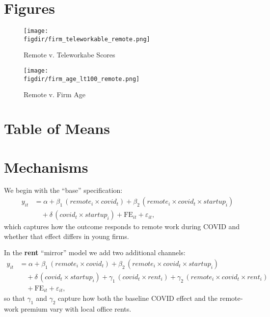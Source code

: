 \documentclass{article}
\newcommand{\cleanedresultsdir}{../results/cleaned}
\newcommand{\figdir}{../results/figures}
\begin{document}
\section{Figures}

\begin{figure}[H]
  \centering
  \texttt{[image: \\figdir/firm\_teleworkable\_remote.png]}
  \caption{Remote v. Teleworkabe Scores}
\end{figure}

\begin{figure}[H]
  \centering
  \texttt{[image: \\figdir/firm\_age\_lt100\_remote.png]}
  \caption{Remote v. Firm Age}
\end{figure}

\clearpage

\section{Table of Means}


\section{Mechanisms}

We begin with the “base” specification:
\[
\begin{aligned}
y_{it} &= \alpha 
  + \beta_1\,(remote_i \times covid_t)
  + \beta_2\,(remote_i \times covid_t \times startup_i) \\
       &\quad
  + \delta\,(covid_t \times startup_i)
  + \mathrm{FE}_{it}
  + \varepsilon_{it},
\end{aligned}
\]
which captures how the outcome responds to remote work during COVID and
whether that effect differs in young firms.

In the \textbf{rent} “mirror” model we add two additional channels:
\[
\begin{aligned}
y_{it} &= \alpha 
  + \beta_1\,(remote_i \times covid_t)
  + \beta_2\,(remote_i \times covid_t \times startup_i) \\
       &\quad
  + \delta\,(covid_t \times startup_i)
  + \gamma_1\,(covid_t \times rent_i)
  + \gamma_2\,(remote_i \times covid_t \times rent_i) \\
       &\quad
  + \mathrm{FE}_{it}
  + \varepsilon_{it},
\end{aligned}
\]
so that \(\gamma_1\) and \(\gamma_2\) capture how both the baseline COVID
effect and the remote‐work premium vary with local office rents.
\end{document}
